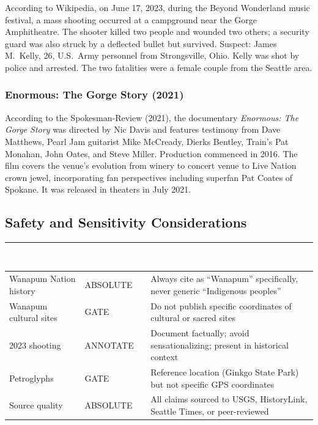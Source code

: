 \documentclass[11pt,letterpaper]{article}
\newcommand{\tableheader}[1]{\textbf{\sffamily\textcolor{white}{#1}}}
\begin{document}
According to Wikipedia, on June 17, 2023, during the Beyond Wonderland music festival, a mass shooting occurred at a campground near the Gorge Amphitheatre. The shooter killed two people and wounded two others; a security guard was also struck by a deflected bullet but survived. Suspect: James M.\ Kelly, 26, U.S.\ Army personnel from Strongsville, Ohio. Kelly was shot by police and arrested. The two fatalities were a female couple from the Seattle area.

\subsubsection{Enormous: The Gorge Story (2021)}

According to the Spokesman-Review (2021), the documentary \textit{Enormous: The Gorge Story} was directed by Nic Davis and features testimony from Dave Matthews, Pearl Jam guitarist Mike McCready, Dierks Bentley, Train's Pat Monahan, John Oates, and Steve Miller. Production commenced in 2016. The film covers the venue's evolution from winery to concert venue to Live Nation crown jewel, incorporating fan perspectives including superfan Pat Coates of Spokane. It was released in theaters in July 2021.

\subsection{Safety and Sensitivity Considerations}

\begin{center}
\begin{tabularx}{\textwidth}{L{3cm}L{2.5cm}X}
\toprule
{}
\tableheader{Area} & \tableheader{Boundary Type} & \tableheader{Requirement} \\
\midrule
Wanapum Nation history & ABSOLUTE & Always cite as ``Wanapum'' specifically, never generic ``Indigenous peoples'' \\
Wanapum cultural sites & GATE & Do not publish specific coordinates of cultural or sacred sites \\
2023 shooting & ANNOTATE & Document factually; avoid sensationalizing; present in historical context \\
Petroglyphs & GATE & Reference location (Ginkgo State Park) but not specific GPS coordinates \\
Source quality & ABSOLUTE & All claims sourced to USGS, HistoryLink, Seattle Times, or peer-reviewed \\
\bottomrule
\end{tabularx}
\end{center}
\end{document}
